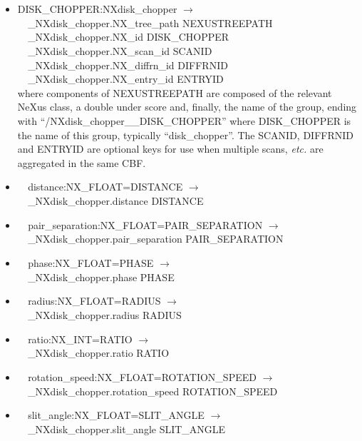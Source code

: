 \documentclass[11pt]{article}
\begin{document}
{{\begin{itemize}

\item{DISK\_CHOPPER:NXdisk\_chopper $\rightarrow$\\
\verb|  |\_NXdisk\_chopper.NX\_tree\_path    NEXUSTREEPATH \\
\verb|  |\_NXdisk\_chopper.NX\_id            DISK\_CHOPPER\\
\verb|  |\_NXdisk\_chopper.NX\_scan\_id      SCANID \\
\verb|  |\_NXdisk\_chopper.NX\_diffrn\_id    DIFFRNID \\
\verb|  |\_NXdisk\_chopper.NX\_entry\_id     ENTRYID \\
where components of NEXUSTREEPATH are composed of the
relevant NeXus class, a double under score and, finally, the
name of the group, ending with ``/NXdisk\_chopper\_\_DISK\_CHOPPER''
where DISK\_CHOPPER is the name of this group, typically ``disk\_chopper''.
The SCANID, DIFFRNID and ENTRYID are optional keys for use
when multiple scans, {\it etc.} are aggregated in the same CBF.}

\item{\verb|  |distance:NX\_FLOAT=DISTANCE $\rightarrow$\\
\verb|  |\_NXdisk\_chopper.distance DISTANCE}

\item{\verb|  |pair\_separation:NX\_FLOAT=PAIR\_SEPARATION $\rightarrow$\\
\verb|  |\_NXdisk\_chopper.pair\_separation PAIR\_SEPARATION}

\item{\verb|  |phase:NX\_FLOAT=PHASE $\rightarrow$\\
\verb|  |\_NXdisk\_chopper.phase PHASE}

\item{\verb|  |radius:NX\_FLOAT=RADIUS $\rightarrow$\\
\verb|  |\_NXdisk\_chopper.radius RADIUS}

\item{\verb|  |ratio:NX\_INT=RATIO $\rightarrow$\\
\verb|  |\_NXdisk\_chopper.ratio RATIO}

\item{\verb|  |rotation\_speed:NX\_FLOAT=ROTATION\_SPEED $\rightarrow$\\
\verb|  |\_NXdisk\_chopper.rotation\_speed ROTATION\_SPEED}

\item{\verb|  |slit\_angle:NX\_FLOAT=SLIT\_ANGLE $\rightarrow$\\
\verb|  |\_NXdisk\_chopper.slit\_angle SLIT\_ANGLE}


\end{itemize}}}
\end{document}
